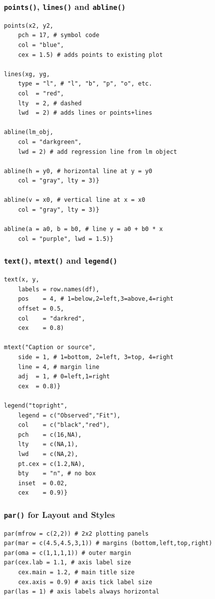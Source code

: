 \documentclass[11pt]{article}
\begin{document}
\begin{itemize}
\subsubsection*{\texttt{points()}, \texttt{lines()} and \texttt{abline()}}
\begin{lstlisting}
points(x2, y2,
    pch = 17, # symbol code
    col = "blue",
    cex = 1.5) # adds points to existing plot

lines(xg, yg,
    type = "l", # "l", "b", "p", "o", etc.
    col  = "red",
    lty  = 2, # dashed
    lwd  = 2) # adds lines or points+lines

abline(lm_obj,
    col = "darkgreen",
    lwd = 2) # add regression line from lm object

abline(h = y0, # horizontal line at y = y0
    col = "gray", lty = 3)}

abline(v = x0, # vertical line at x = x0
    col = "gray", lty = 3)}

abline(a = a0, b = b0, # line y = a0 + b0 * x
    col = "purple", lwd = 1.5)}
\end{lstlisting}

\subsubsection*{\texttt{text()}, \texttt{mtext()} and \texttt{legend()}}
\begin{lstlisting}
text(x, y,
    labels = row.names(df),
    pos    = 4, # 1=below,2=left,3=above,4=right
    offset = 0.5,
    col    = "darkred",
    cex    = 0.8)

mtext("Caption or source", 
    side = 1, # 1=bottom, 2=left, 3=top, 4=right
    line = 4, # margin line
    adj  = 1, # 0=left,1=right
    cex  = 0.8)}

legend("topright",
    legend = c("Observed","Fit"),
    col    = c("black","red"),
    pch    = c(16,NA),
    lty    = c(NA,1),
    lwd    = c(NA,2),
    pt.cex = c(1.2,NA),
    bty    = "n", # no box
    inset  = 0.02,
    cex    = 0.9)}
\end{lstlisting}

\subsubsection*{\texttt{par()} for Layout and Styles}
\begin{lstlisting}
par(mfrow = c(2,2)) # 2x2 plotting panels
par(mar = c(4.5,4.5,3,1)) # margins (bottom,left,top,right)
par(oma = c(1,1,1,1)) # outer margin
par(cex.lab = 1.1, # axis label size
    cex.main = 1.2, # main title size
    cex.axis = 0.9) # axis tick label size
par(las = 1) # axis labels always horizontal
\end{lstlisting}


\end{itemize}
\end{document}
